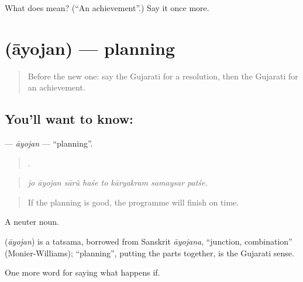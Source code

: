 \begin{tcolorbox}[breakable,colback=teal!4,colframe=teal!35!black,title={Before you move on}]
What does  mean? (\textquotedblleft{}An achievement\textquotedblright{}.) Say it once more.
\end{tcolorbox}
\section[\texorpdfstring{\gu{આયોજન} (āyojan)}{આયોજન (āyojan)}]{ (āyojan) — planning}

\label{lesson:GU-C382-ayojan}



\begin{quote}
Before the new one: say the Gujarati for a resolution, then the Gujarati for an achievement.
\end{quote}

\subsection*{You'll want to know: }
\textbf{} — \emph{āyojan} — \textquotedblleft{}planning\textquotedblright{}.

\begin{quote}
       .
\end{quote}

\begin{quote}
\emph{jo āyojan sārũ haśe to kāryakram samaysar patśe.}
\end{quote}

\begin{quote}
If the planning is good, the programme will finish on time.
\end{quote}

A neuter noun.

\begin{cousinweb}
\textbf{} (\emph{āyojan}) is a tatsama, borrowed from Sanskrit \emph{āyojana}, \textquotedblleft{}junction, combination\textquotedblright{} (Monier-Williams); \textquotedblleft{}planning\textquotedblright{}, putting the parts together, is the Gujarati sense.
\end{cousinweb}

\begin{grammarlens}[title={What you've built}]
One more word for saying what happens if.
\end{grammarlens}

